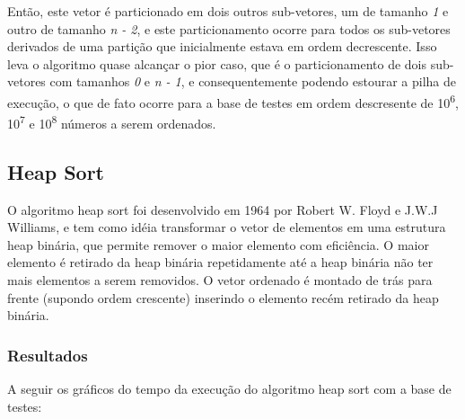 \documentclass[fleqn,10pt]{SelfArx} %
\begin{document}
Então, este vetor é particionado em dois outros sub-vetores, um de tamanho \emph{1} e outro de tamanho \emph{n - 2}, e 
este particionamento ocorre para todos os sub-vetores derivados de uma partição que inicialmente estava em ordem decrescente. 
Isso leva o algoritmo quase alcançar o pior caso, que é o particionamento de dois sub-vetores com tamanhos \emph{0} e 
\emph{n - 1}, e consequentemente podendo estourar a pilha de execução, o que de fato ocorre para a base de testes em 
ordem descresente de 10\textsuperscript{6}, 10\textsuperscript{7} e 10\textsuperscript{8} números a serem ordenados.

\subsection{Heap Sort}

O algoritmo heap sort foi desenvolvido em 1964 por Robert W. Floyd e J.W.J Williams, e tem como idéia transformar o vetor 
de elementos em uma estrutura heap binária, que permite remover o maior elemento com eficiência. O maior elemento é 
retirado da heap binária repetidamente até a heap binária não ter mais elementos a serem removidos. O vetor ordenado 
é montado de trás para frente (supondo ordem crescente) inserindo o elemento recém retirado da heap binária.

\subsubsection*{Resultados}

A seguir os gráficos do tempo da execução do algoritmo heap sort com a base de testes:\newline

{\setlength{\parindent}{-0.5em}
}\newline

{\setlength{\parindent}{-0.5em}
}\newline
\end{document}
